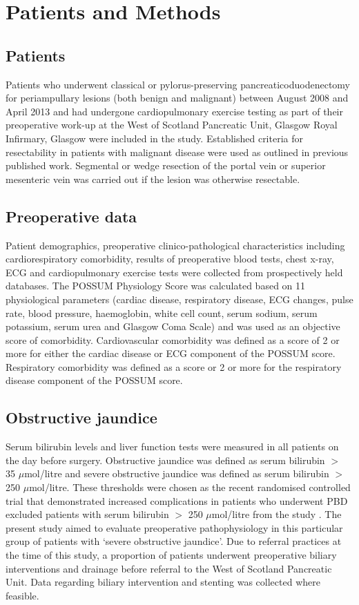 \clearpage

\section{Patients and Methods}

\subsection{Patients}
Patients who underwent classical or pylorus-preserving pancreaticoduodenectomy for periampullary lesions (both benign and malignant) between August 2008 and April 2013 and had undergone cardiopulmonary exercise testing as part of their preoperative work-up at the West of Scotland Pancreatic Unit, Glasgow Royal Infirmary, Glasgow were included in the study. 
Established criteria for resectability in patients with malignant disease were used as outlined in previous published work. 
Segmental or wedge resection of the portal vein or superior mesenteric vein was carried out if the lesion was otherwise resectable.

\subsection{Preoperative data}
Patient demographics, preoperative clinico-pathological characteristics including cardiorespiratory comorbidity, results of preoperative blood tests, chest x-ray, ECG and cardiopulmonary exercise tests were collected from prospectively held databases. 
The POSSUM Physiology Score was calculated based on 11 physiological parameters (cardiac disease, respiratory disease, ECG changes, pulse rate, blood pressure, haemoglobin, white cell count, serum sodium, serum potassium, serum urea and Glasgow Coma Scale) and was used as an objective score of comorbidity. 
Cardiovascular comorbidity was defined as a score of 2 or more for either the cardiac disease or ECG component of the POSSUM score. 
Respiratory comorbidity was defined as a score or 2 or more for the respiratory disease component of the POSSUM score. 

\subsection{Obstructive jaundice}
Serum bilirubin levels and liver function tests were measured in all patients on the day before surgery. 
Obstructive jaundice was defined as serum bilirubin $>$ 35 $\mu$mol/litre and severe obstructive jaundice was defined as serum bilirubin $>$ 250 $\mu$mol/litre. 
These thresholds were chosen as the recent randomised controlled trial that demonstrated increased complications in patients who underwent PBD excluded patients with serum bilirubin $>$ 250 $\mu$mol/litre from the study \parencite{van_der_gaag_preoperative_2010}.
The present study aimed to evaluate preoperative pathophysiology in this particular group of patients with `severe obstructive jaundice'.
Due to referral practices at the time of this study, a proportion of patients underwent preoperative biliary interventions and drainage before referral to the West of Scotland Pancreatic Unit. 
Data regarding biliary intervention and stenting was collected where feasible.

